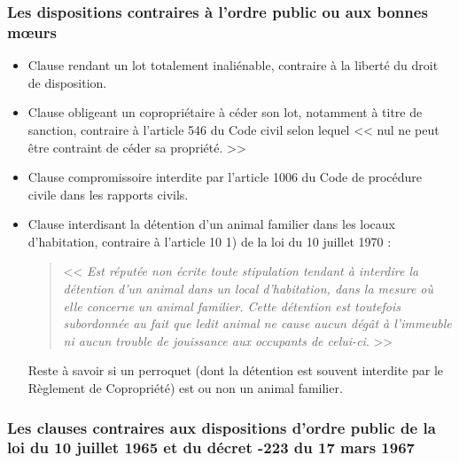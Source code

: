 		\subsubsection{Les dispositions contraires à l'ordre public ou aux bonnes mœurs}
		
			\begin{itemize}
				\item Clause rendant un lot totalement inaliénable, contraire à la liberté du droit de disposition.
				
				\item Clause obligeant un copropriétaire à céder son lot, notamment à titre de sanction, contraire à l'article 546 du Code civil selon lequel << nul ne peut être contraint de céder sa propriété. >>
				
				\item Clause compromissoire interdite par l'article 1006 du Code de procédure civile dans les rapports civils.
				
				\item Clause interdisant la détention d'un animal familier dans les locaux d'habitation, contraire à l'article 10 1) de la loi du 10 juillet 1970 :
				\begin{quote}
					<< {\itshape Est réputée non écrite toute stipulation tendant à interdire la détention d'un animal dans un local d'habitation, dans la mesure où elle concerne un animal familier. Cette détention est toutefois subordonnée au fait que ledit animal ne cause aucun dégât à l'immeuble ni aucun trouble de jouissance aux occupants de celui-ci}. >>
				\end{quote}
				
				Reste à savoir si un perroquet (dont la détention est souvent interdite par le Règlement de Copropriété) est ou non un animal familier.
			\end{itemize}
		
		\subsubsection{Les clauses contraires aux dispositions d'ordre public de la loi du 10 juillet 1965 et du décret -223 du 17 mars 1967}
		

